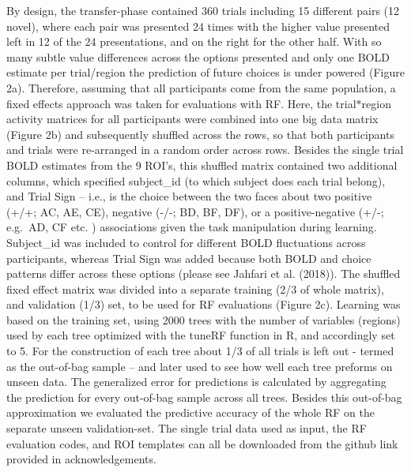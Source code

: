 \documentclass[]{article}
\begin{document}
By design, the transfer-phase contained 360 trials including 15
different pairs (12 novel), where each pair was presented 24 times with
the higher value presented left in 12 of the 24 presentations, and on
the right for the other half. With so many subtle value differences
across the options presented and only one BOLD estimate per trial/region
the prediction of future choices is under powered (Figure 2a).
Therefore, assuming that all participants come from the same population,
a fixed effects approach was taken for evaluations with RF. Here, the
trial\(*\)region activity matrices for all participants were combined
into one big data matrix (Figure 2b) and subsequently shuffled across
the rows, so that both participants and trials were re-arranged in a
random order across rows. Besides the single trial BOLD estimates from
the 9 ROI's, this shuffled matrix contained two additional columns,
which specified subject\_id (to which subject does each trial belong),
and Trial Sign -- i.e., is the choice between the two faces about two
positive (+/+; AC, AE, CE), negative (-/-; BD, BF, DF), or a
positive-negative (+/-; e.g.~AD, CF etc. ) associations given the task
manipulation during learning. Subject\_id was included to control for
different BOLD fluctuations across participants, whereas Trial Sign was
added because both BOLD and choice patterns differ across these options
(please see Jahfari et al. (2018)). The shuffled fixed effect matrix was
divided into a separate training (2/3 of whole matrix), and validation
(1/3) set, to be used for RF evaluations (Figure 2c). Learning was based
on the training set, using 2000 trees with the number of variables
(regions) used by each tree optimized with the tuneRF function in R, and
accordingly set to 5. For the construction of each tree about 1/3 of all
trials is left out - termed as the out-of-bag sample -- and later used
to see how well each tree preforms on unseen data. The generalized error
for predictions is calculated by aggregating the prediction for every
out-of-bag sample across all trees. Besides this out-of-bag
approximation we evaluated the predictive accuracy of the whole RF on
the separate unseen validation-set. The single trial data used as input,
the RF evaluation codes, and ROI templates can all be downloaded from
the github link provided in acknowledgements.
\end{document}
